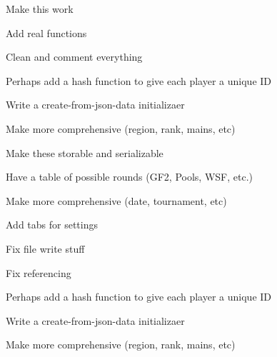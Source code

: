 
\begin{DoxyRefList}
\item[\label{todo__todo000001}%
\Hypertarget{todo__todo000001}%
File \hyperlink{file__manip_8py}{file\+\_\+manip.py} ]
\begin{DoxyItemize}
\item Make this work
\item Add real functions
\item Clean and comment everything  
\end{DoxyItemize}
\item[\label{todo__todo000003}%
\Hypertarget{todo__todo000003}%
File \hyperlink{information_8py}{information.py} ]
\begin{DoxyItemize}
\item Perhaps add a hash function to give each player a unique ID
\item Write a create-\/from-\/json-\/data initializaer
\item Make more comprehensive (region, rank, mains, etc)  
\end{DoxyItemize}
\item[\label{todo__todo000004}%
\Hypertarget{todo__todo000004}%
File \hyperlink{match_8py}{match.py} ]
\begin{DoxyItemize}
\item Make these storable and serializable
\item Have a table of possible rounds (G\+F2, Pools, W\+SF, etc.)
\item Make more comprehensive (date, tournament, etc)  
\end{DoxyItemize}
\item[\label{todo__todo000002}%
\Hypertarget{todo__todo000002}%
File \hyperlink{player_8py}{player.py} ]
\begin{DoxyItemize}
\item Add tabs for settings
\item Fix file write stuff
\item Fix referencing 
\end{DoxyItemize}


\begin{DoxyItemize}
\item Perhaps add a hash function to give each player a unique ID
\item Write a create-\/from-\/json-\/data initializaer
\item Make more comprehensive (region, rank, mains, etc) 
\end{DoxyItemize}
\end{DoxyRefList}